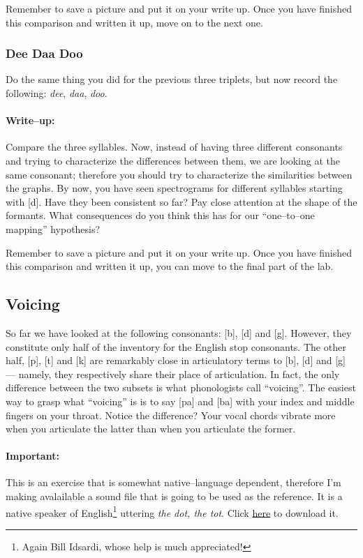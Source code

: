 \documentclass{article}
\begin{document}
Remember to save a picture and put it on your write up. Once you have finished this comparison and written it up, move on to the next one.

\subsubsection{Dee Daa Doo}

Do the same thing you did for the previous three triplets, but now record the following: \emph{dee}, \emph{daa}, \emph{doo}.

\paragraph{Write--up:} Compare the three syllables. Now, instead of having three different consonants and trying to characterize the differences between them, we are looking at the same consonant; therefore you should try to characterize the similarities between the graphs. By now, you have seen spectrograms for different syllables starting with [d]. Have they been consistent so far? Pay close attention at the shape of the formants. What consequences do you think this has for our ``one--to--one mapping'' hypothesis?

Remember to save a picture and put it on your write up. Once you have finished this comparison and written it up, you can move to the final part of the lab.

\subsection{Voicing}

So far we have looked at the following consonants: [b], [d] and [g]. However, they constitute only half of the inventory for the English stop consonants. The other half, [p], [t] and [k] are remarkably close in articulatory terms to [b], [d] and [g] --- namely, they respectively share their place of articulation. In fact, the only difference between the two subsets is what phonologists call ``voicing''. The easiest way to grasp what ``voicing'' is is to say [pa] and [ba] with your index and middle fingers on your throat. Notice the difference? Your vocal chords vibrate more when you articulate the latter than when you articulate the former.

\paragraph{Important:} This is an exercise that is somewhat native--language dependent, therefore I'm making avalailable a sound file that is going to be used as the reference. It is a native speaker of English\footnote{Again Bill Idsardi, whose help is much appreciated!} uttering \emph{the dot, the tot}. Click \href{http://www.ling.umd.edu/~diogo/courses/ling499a/thedot_thetot.wav}{here} to download it.
\end{document}
